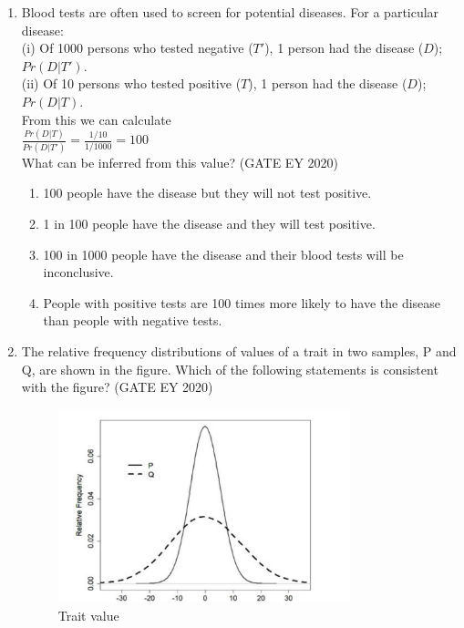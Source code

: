 \begin{enumerate}
\item
Blood tests are often used to screen for potential diseases. For a particular disease:\\
(i) Of 1000 persons who tested negative ($T'$), 1 person had the disease ($D$); $Pr(D|T').$\\
(ii) Of 10 persons who tested positive ($T$), 1 person had the disease ($D$); $Pr(D|T)$.\\
From this we can calculate\\\newline
$\displaystyle \frac{Pr(D|T)}{Pr(D|T')} = \frac{1/10}{1/1000} = 100$\\
What can be inferred from this value? \hfill {(GATE EY 2020)}
\begin{multicols}{2}
\begin{enumerate}
\item 100 people have the disease but they will not test positive.
\item 1 in 100 people have the disease and they will test positive.
\item 100 in 1000 people have the disease and their blood tests will be inconclusive.
\item People with positive tests are 100 times more likely to have the disease than people with negative tests.
\end{enumerate}
\end{multicols}

\item
The relative frequency distributions of values of a trait in two samples, P and Q, are shown in the figure. Which of the following statements is consistent with the figure? \hfill {(GATE EY 2020)}


\begin{figure}[H]
\centering
    \includegraphics[width=0.8\textwidth]{figs/fig11.png}
\caption{Trait value}
\label{fig:q46}
\end{figure}



\end{enumerate}

